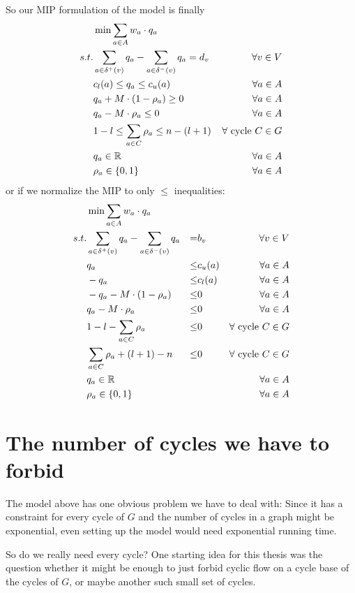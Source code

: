 So our MIP formulation of the model is finally
\begin{align*}
 &\min \sum_{a\in A} w_a\cdot q_a & \\
 s.t. & \sum_{a\in \delta^+(v)}q_a - \sum_{a\in\delta^- (v)}q_a = d_v\ &\forall v\in V \\
  & c_l(a)\le q_a \le c_u(a) & \forall a\in A\\
 &q_a + M\cdot (1-\rho_a) \ge 0 & \forall a\in A\\
 &q_a - M\cdot \rho_a \le 0 & \forall a\in A\\
 &1-l \le \sum_{a\in C}\rho_a \le n-(l+1) & \forall \textrm{ cycle }C\in G\\
 & q_a \in \mathbb{R} &\forall a\in A\\
 & \rho_a \in \{0,1\} &\forall a\in A
\end{align*}
or if we normalize the MIP to only $\le$ inequalities:
\begin{align}
 &\min \sum_{a\in A} w_a\cdot q_a & \\
 s.t. & \sum_{a\in \delta^+(v)}q_a - \sum_{a\in\delta^- (v)}q_a &=& b_v\ &\forall v\in V \\
 & q_a &\le& c_u(a) & \forall a\in A\\
 & -q_a &\le& c_l(a) & \forall a\in A\\
 &-q_a - M\cdot (1-\rho_a) &\le& 0 & \forall a\in A\\
 &q_a - M\cdot \rho_a &\le& 0 & \forall a\in A\\
 &1-l - \sum_{a\in C}\rho_a &\le& 0 & \forall \textrm{ cycle }C\in G\\
 & \sum_{a\in C}\rho_a +(l+1)-n &\le& 0 & \forall \textrm{ cycle }C\in G\\
 & q_a \in \mathbb{R} & & &\forall a\in A\\
 & \rho_a \in \{0,1\} & & &\forall a\in A
\end{align}


\section{The number of cycles we have to forbid}
The model above has one obvious problem we have to deal with: Since it has a constraint for every cycle of $G$ and the 
number of cycles in a graph might be exponential, even setting up the model would need exponential running time. 

So do we really need every cycle? One starting idea for this thesis was the question whether it might be enough to just 
forbid cyclic flow on a cycle base of the cycles of $G$, or maybe another such small set of cycles.

